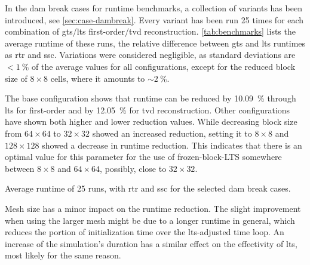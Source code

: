 In the dam break cases for runtime benchmarks, a collection of variants has been introduced, see \autoref{sec:case-dambreak}.
Every variant has been run 25 times for each combination of \gls{gts}/\gls{lts} first-order/\gls{tvd} reconstruction.
\autoref{tab:benchmarks} lists the average runtime of these runs, the relative difference between \gls{gts} and \gls{lts} runtimes as \gls{rtr} and \acrfull{ssc}.
Variations were considered negligible, as standard deviations are $< \SI{1}{\percent}$ of the average values for all configurations, except for the reduced block size of $8 \times 8$ cells, where it amounts to $\sim\!\SI{2}{\percent}$.

The base configuration shows that runtime can be reduced by \SI{10.09}{\percent} through \gls{lts} for first-order and by \SI{12.05}{\percent} for \gls{tvd} reconstruction.
Other configurations have shown both higher and lower reduction values.
While decreasing block size from $64 \times 64$ to $32 \times 32$ showed an increased reduction, setting it to $8 \times 8$ and $128 \times 128$ showed a decrease in runtime reduction.
This indicates that there is an optimal value for this parameter for the use of \gls{frozen-block-LTS} somewhere between $8 \times 8$ and $64 \times 64$, possibly, close to $32 \times 32$.

\begin{table}[!h]
  \caption{
    Average runtime of 25 runs, with \acrfull{rtr} and \acrfull{ssc} for the selected dam break cases.
  }
  \label{tab:benchmarks}
  \small
  \begin{adjustbox}{center}
  
  \end{adjustbox}
\end{table}

\newpage
Mesh size has a minor impact on the runtime reduction.
The slight improvement when using the larger mesh might be due to a longer runtime in general, which reduces the portion of initialization time over the \gls{lts}-adjusted time loop.
An increase of the simulation's duration has a similar effect 
on the effectivity of \gls{lts}, most likely for the same reason.

